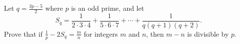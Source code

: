 Let $q = \frac{3p-5}{2}$ where $p$ is an odd prime, and let \[S_q=\frac{1}{2\cdot3\cdot4}+\frac{1}{5\cdot6\cdot7}+\cdots+\frac{1}{q(q+1)(q+2)}.\] Prove that if $\frac{1}{p}-2S_q=\frac{m}{n}$ for integers $m$ and $n$, then $m-n$ is divisible by $p$.